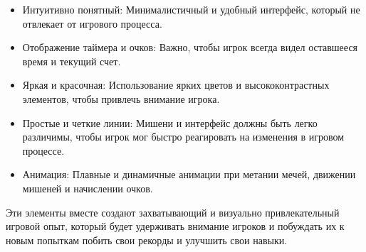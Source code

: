 \begin{itemize}
	\item Интуитивно понятный: Минималистичный и удобный интерфейс, который не отвлекает от игрового процесса.
	\item Отображение таймера и очков: Важно, чтобы игрок всегда видел оставшееся время и текущий счет.


	\item Яркая и красочная: Использование ярких цветов и высококонтрастных элементов, чтобы привлечь внимание игрока.
	\item Простые и четкие линии: Мишени и интерфейс должны быть легко различимы, чтобы игрок мог быстро реагировать на изменения в игровом процессе.
	\item Анимация: Плавные и динамичные анимации при метании мечей, движении мишеней и начислении очков.
\end{itemize}



Эти элементы вместе создают захватывающий и визуально привлекательный игровой опыт, который будет удерживать
внимание игроков и побуждать их к новым попыткам побить свои рекорды и улучшить свои навыки.

